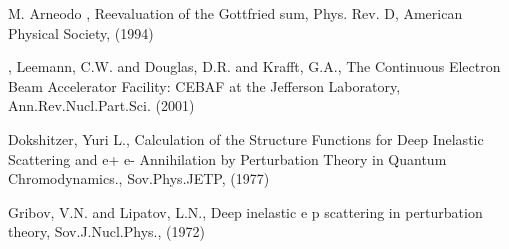      M. Arneodo \etal, Reevaluation of the Gottfried sum,
      Phys. Rev. D, American Physical Society, (1994)

,
      Leemann, C.W. and Douglas, D.R. and Krafft, G.A., The Continuous Electron Beam Accelerator Facility: CEBAF at the Jefferson Laboratory,
      Ann.Rev.Nucl.Part.Sci. (2001)

      Dokshitzer, Yuri L., Calculation of the Structure Functions for Deep
                        Inelastic Scattering and e+ e- Annihilation by
                        Perturbation Theory in Quantum Chromodynamics.,
      Sov.Phys.JETP, (1977)

      Gribov, V.N. and Lipatov, L.N.,
      Deep inelastic e p scattering in perturbation theory,
      Sov.J.Nucl.Phys., (1972)

